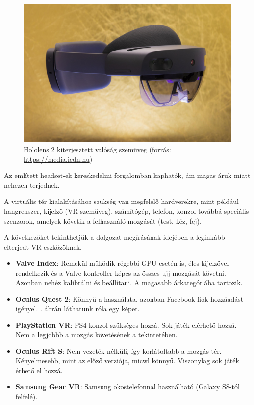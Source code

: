 
\begin{figure}[htp]
    \centering
   	\includegraphics[scale=0.1]{images/holo.jpg}
	\caption{Hololens 2 kiterjesztett valóság szemüveg (forrás: \url{https://media.icdn.hu})}
	\label{fig:hololens}
\end{figure}

Az említett headset-ek kereskedelmi forgalomban kaphatók, ám magas áruk miatt nehezen terjednek. 


A virtuális tér kialakításához szükség van megfelelő hardverekre, mint például hangrenszer, kijelző (VR szemüveg), számítógép, telefon, konzol továbbá speciális szenzorok, amelyek követik a felhasználó mozgását (test, kéz, fej).

A következőket tekinthetjük a dolgozat megírásának idejében a leginkább elterjedt VR eszközöknek.
\begin{itemize}
\item {\bf Valve Index}: Remekül működik régebbi GPU esetén is, éles kijelzővel rendelkezik és a Valve kontroller képes az összes ujj mozgását követni. Azonban nehéz kalibrálni és beállítani. A magasabb árkategóriába tartozik.
\item {\bf Oculus Quest 2}: Könnyű a használata, azonban Facebook fiók hozzáadást igényel. . ábrán láthatunk róla egy képet.
\item {\bf PlayStation VR}: PS4 konzol szükséges hozzá. Sok játék elérhető hozzá. Nem a legjobbb a mozgás követésének a tekintetében.
\item {\bf Oculus Rift S}: Nem vezeték nélküli, így korlátoltabb a mozgás tér.  Kényelmesebb, mint az előző verziója, micwl könnyű. Viszonylag sok játék érhető el hozzá.
\item {\bf Samsung Gear VR}: Samsung okostelefonnal használható (Galaxy S8-tól felfelé).
\end{itemize}

